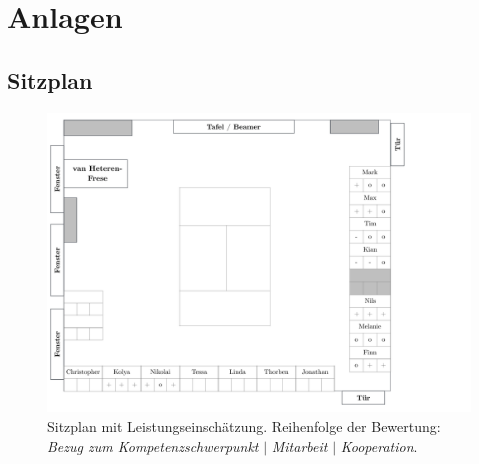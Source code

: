 \section{Anlagen}
\subsection{Sitzplan}
\begin{figure}[htbp]
\centering
\includegraphics[width=\linewidth, clip, trim= 0cm 0.5cm 4.6cm 0cm]{Sitzplan-inz2_II206.pdf}
\caption{Sitzplan mit Leistungseinschätzung. Reihenfolge der Bewertung: \textit{Bezug zum Kompetenzschwerpunkt} $\mid$ \textit{Mitarbeit} $\mid$ \textit{Kooperation}.}
\end{figure}
%
